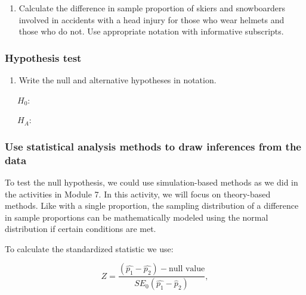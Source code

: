 \documentclass[
]{report}
\providecommand{\tightlist}{%
  \setlength{\itemsep}{0pt}\setlength{\parskip}{0pt}}
\begin{document}
\vspace{1in}

\begin{enumerate}
\def\labelenumi{\arabic{enumi}.}
\setcounter{enumi}{2}
\tightlist
\item
  Calculate the difference in sample proportion of skiers and snowboarders involved in accidents with a head injury for those who wear helmets and those who do not. Use appropriate notation with informative subscripts.
\end{enumerate}

\vspace{0.8in}

\subsubsection*{Hypothesis test}\label{hypothesis-test-2}

\begin{enumerate}
\def\labelenumi{\arabic{enumi}.}
\setcounter{enumi}{3}
\tightlist
\item
  Write the null and alternative hypotheses in notation.
\end{enumerate}

~~~\(H_0\):

\vspace{0.2in}

~~~\(H_A\):

\vspace{0.2in}

\subsubsection*{Use statistical analysis methods to draw inferences from the data}\label{use-statistical-analysis-methods-to-draw-inferences-from-the-data}

To test the null hypothesis, we could use simulation-based methods as we did in the activities in Module 7. In this activity, we will focus on theory-based methods. Like with a single proportion, the sampling distribution of a difference in sample proportions can be mathematically modeled using the normal distribution if certain conditions are met.

To calculate the standardized statistic we use:

\[
Z = \frac{(\hat{p_1} - \hat{p_2}) - \text{null value}}{SE_0(\hat{p_1}-\hat{p}_2)},
\]
\end{document}
